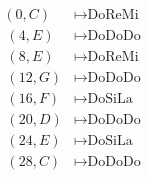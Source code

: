 \documentclass[preview]{standalone}
\begin{document}
\begin{align*}
(0,C) & \mapsto \text{DoReMi} \\ \
        (4,E) & \mapsto \text{DoDoDo} \\ \
        (8,E) & \mapsto \text{DoReMi} \\ \
        (12,G) & \mapsto \text{DoDoDo} \\ \
        (16,F) & \mapsto \text{DoSiLa} \\ \
        (20,D) & \mapsto \text{DoDoDo} \\ \
        (24,E) & \mapsto \text{DoSiLa} \\ \
        (28,C) & \mapsto \text{DoDoDo} \\ \
\end{align*}
\end{document}
